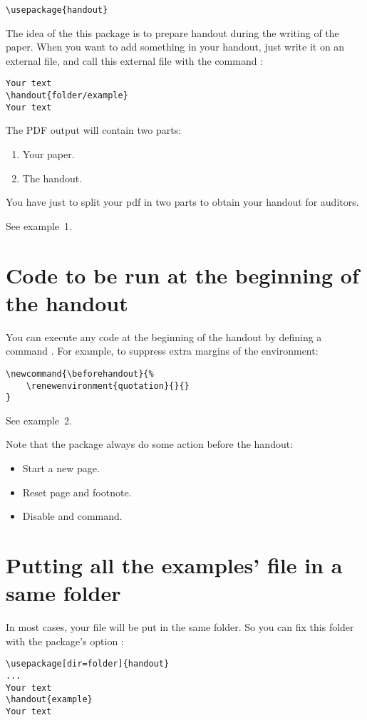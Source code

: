 \documentclass{ltxdockit}[2011/03/25]
\begin{document}
\begin{verbatim}
\usepackage{handout}
\end{verbatim}
The idea of the this package is to prepare handout during the writing of the paper. When you want to add something in your handout, just write it on an external file, and call this external file with the command  :

\begin{verbatim}
Your text
\handout{folder/example}
Your text
\end{verbatim}

The PDF output will contain two parts:
\begin{enumerate}
	\item Your paper.
	\item The handout.
\end{enumerate}

You have just to split your pdf in two parts to obtain your handout for auditors.

See example~1.

\section{Code to be run at the beginning of the handout}

You can execute any code at the beginning of the handout by defining a command . For example, to suppress extra margins of the  environment:
\begin{verbatim}
\newcommand{\beforehandout}{%
	\renewenvironment{quotation}{}{}
}
\end{verbatim}

See example~2.

Note that the package always do some action before the handout:
\begin{itemize}
	\item Start a new page.
	\item Reset page and footnote.
	\item Disable  and  command.
\end{itemize}
\section{Putting all the examples' file in a same folder}

In most cases, your file will be put in the same folder. So you can fix this folder with the package's option :
\begin{verbatim}
\usepackage[dir=folder]{handout}
...
Your text
\handout{example}
Your text
\end{verbatim}
\end{document}
